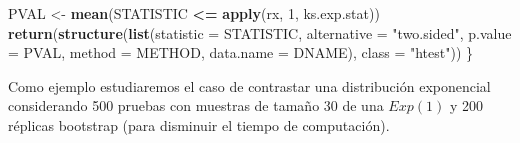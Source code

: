 \documentclass[
]{book}
\newenvironment{Shaded}{\begin{snugshade}}{\end{snugshade}}
\newcommand{\DataTypeTok}[1]{\textcolor[rgb]{0.13,0.29,0.53}{#1}}
\newcommand{\DecValTok}[1]{\textcolor[rgb]{0.00,0.00,0.81}{#1}}
\newcommand{\KeywordTok}[1]{\textcolor[rgb]{0.13,0.29,0.53}{\textbf{#1}}}
\newcommand{\NormalTok}[1]{#1}
\newcommand{\OperatorTok}[1]{\textcolor[rgb]{0.81,0.36,0.00}{\textbf{#1}}}
\newcommand{\StringTok}[1]{\textcolor[rgb]{0.31,0.60,0.02}{#1}}
\theoremstyle{definition}
\theoremstyle{definition}
\theoremstyle{definition}
\theoremstyle{remark}
\begin{document}
\begin{Shaded}
\begin{Highlighting}[]
\NormalTok{  PVAL <-}\StringTok{ }\KeywordTok{mean}\NormalTok{(STATISTIC }\OperatorTok{<=}\StringTok{ }\KeywordTok{apply}\NormalTok{(rx, }\DecValTok{1}\NormalTok{, ks.exp.stat))}
  \KeywordTok{return}\NormalTok{(}\KeywordTok{structure}\NormalTok{(}\KeywordTok{list}\NormalTok{(}\DataTypeTok{statistic =}\NormalTok{ STATISTIC, }\DataTypeTok{alternative =} \StringTok{"two.sided"}\NormalTok{, }
                   \DataTypeTok{p.value =}\NormalTok{ PVAL, }\DataTypeTok{method =}\NormalTok{ METHOD, }\DataTypeTok{data.name =}\NormalTok{ DNAME), }
                   \DataTypeTok{class =} \StringTok{"htest"}\NormalTok{))}
\NormalTok{\}}
\end{Highlighting}
\end{Shaded}

Como ejemplo estudiaremos el caso de contrastar una distribución exponencial
considerando 500 pruebas con muestras de tamaño 30 de una \(Exp(1)\)
y 200 réplicas bootstrap (para disminuir el tiempo de computación).
\end{document}
